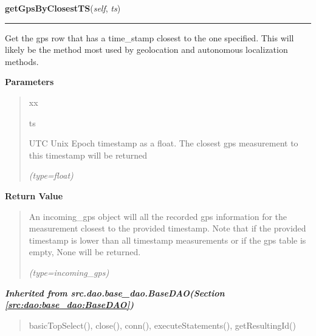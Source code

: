 \hspace{.8\funcindent}\begin{boxedminipage}{\funcwidth}

    \raggedright \textbf{getGpsByClosestTS}(\textit{self}, \textit{ts})

    \vspace{-1.5ex}

    \rule{\textwidth}{0.5\fboxrule}
\setlength{\parskip}{2ex}
    Get the gps row that has a time\_stamp closest to the one specified. 
    This will likely be the method most used by geolocation and autonomous 
    localization methods.

\setlength{\parskip}{1ex}
      \textbf{Parameters}
      \vspace{-1ex}

      \begin{quote}
        \begin{Ventry}{xx}

          \item[ts]

          UTC Unix Epoch timestamp as a float. The closest gps measurement 
          to this timestamp will be returned

            {\it (type=float)}

        \end{Ventry}

      \end{quote}

      \textbf{Return Value}
    \vspace{-1ex}

      \begin{quote}
      An incoming\_gps object will all the recorded gps information for the
      measurement closest to the provided timestamp. Note that if the 
      provided timestamp is lower than all timestamp measurements or if the
      gps table is empty, None will be returned.

      {\it (type=incoming\_gps)}

      \end{quote}

    \end{boxedminipage}


\large{\textbf{\textit{Inherited from src.dao.base\_dao.BaseDAO\textit{(Section \ref{src:dao:base_dao:BaseDAO})}}}}

\begin{quote}
basicTopSelect(), close(), conn(), executeStatements(), getResultingId()
\end{quote}

